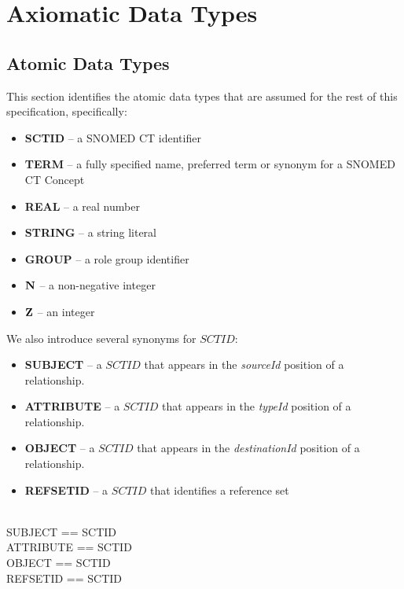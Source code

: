 \documentclass{article}
\begin{document}
\tableofcontents

\section{Axiomatic Data Types}
\subsection{Atomic Data Types}
This section identifies the atomic data types that are assumed for the rest of this specification, specifically:
\begin{itemize}[noitemsep]
\item \textbf{SCTID} -- a SNOMED CT identifier
\item \textbf{TERM} --  a  fully specified name, preferred term or synonym for a SNOMED CT Concept
\item \textbf{REAL} --  a real number
\item \textbf{STRING} -- a string literal
\item \textbf{GROUP} -- a role group identifier
\item \textbf{${\mathbf{N}}$} -- a non-negative integer
\item \textbf{${\mathbf{Z}}$} -- an integer
\end{itemize}


We also introduce several synonyms for $SCTID$:
\begin{itemize}[noitemsep]
\item \textbf{SUBJECT} -- a $SCTID$ that appears in the \emph{sourceId} position of a relationship.
\item \textbf{ATTRIBUTE} -- a $SCTID$ that appears in the \emph{typeId} position of a relationship.
\item \textbf{OBJECT} -- a $SCTID$ that appears in the \emph{destinationId} position of a relationship.
\item \textbf{REFSETID} -- a $SCTID$ that identifies a reference set
\end{itemize}

\begin{zed}
 \\
\also
SUBJECT == SCTID \\
ATTRIBUTE == SCTID \\
OBJECT == SCTID \\
REFSETID == SCTID 
\end{zed}
\end{document}
